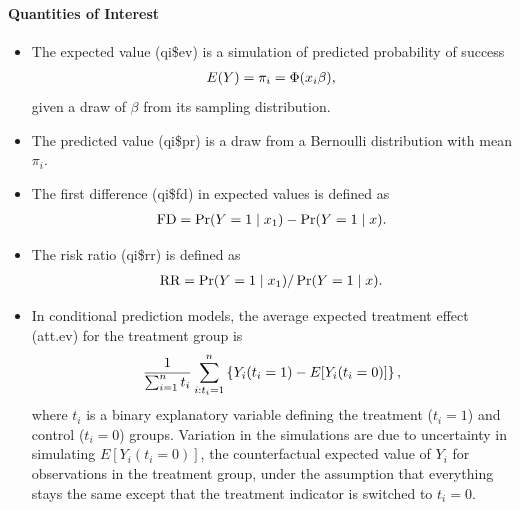 \documentclass[letterpaper,10pt,english]{sphinxmanual}
\begin{document}
\paragraph{Quantities of Interest}
\label{zelig-probit:quantities-of-interest}\begin{itemize}
\item {} 
The expected value (qi\$ev) is a simulation of predicted probability
of success
\begin{gather}
\begin{split}E(Y) = \pi_i = \Phi(x_i
  \beta),\end{split}\notag
\end{gather}
given a draw of \(\beta\) from its sampling distribution.

\item {} 
The predicted value (qi\$pr) is a draw from a Bernoulli distribution
with mean \(\pi_i\).

\item {} 
The first difference (qi\$fd) in expected values is defined as
\begin{gather}
\begin{split}\textrm{FD} = \Pr(Y = 1 \mid x_1) - \Pr(Y = 1 \mid x).\end{split}\notag
\end{gather}
\item {} 
The risk ratio (qi\$rr) is defined as
\begin{gather}
\begin{split}\textrm{RR} = \Pr(Y = 1 \mid x_1) / \Pr(Y = 1 \mid x).\end{split}\notag
\end{gather}
\item {} 
In conditional prediction models, the average expected treatment
effect (att.ev) for the treatment group is
\begin{gather}
\begin{split}\frac{1}{\sum_{i=1}^n t_i}\sum_{i:t_i=1}^n \left\{ Y_i(t_i=1) -
      E[Y_i(t_i=0)] \right\},\end{split}\notag
\end{gather}
where \(t_i\) is a binary explanatory variable defining the
treatment (\(t_i=1\)) and control (\(t_i=0\)) groups.
Variation in the simulations are due to uncertainty in simulating
\(E[Y_i(t_i=0)]\), the counterfactual expected value of
\(Y_i\) for observations in the treatment group, under the
assumption that everything stays the same except that the treatment
indicator is switched to \(t_i=0\).


\end{itemize}
\end{document}

